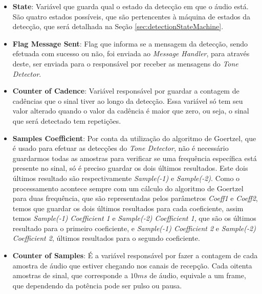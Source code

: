 \documentclass[monografia]{subfiles}
\begin{document}
		\begin{itemize}
		\item \textbf{State}: 
			Variável que guarda qual o estado da detecção em que o áudio está. São quatro estados possíveis, que são pertencentes 
			à máquina de estados da detecção, que será detalhada na Seção \ref{sec:detectionStateMachine}.
		\end{itemize}

		\begin{itemize}
		\item \textbf{Flag Message Sent}: 
			Flag que informa se a mensagem da detecção, sendo efetuada com sucesso ou não, foi enviada ao \textit{Message Handler},
			para através deste, ser enviada para o responsável por receber as mensagens do \textit{Tone Detector}.
		\end{itemize}

		\begin{itemize}
		\item \textbf{Counter of Cadence}: 
			Variável responsável por guardar a contagem de cadências que o sinal tiver ao longo da detecção. Essa variável só tem
			seu valor alterado quando o valor da cadência é maior que zero, ou seja, o sinal que será detectado tem repetições.
		\end{itemize}

		\begin{itemize}
		\item \textbf{Samples Coefficient}: 
			Por conta da utilização do algoritmo de Goertzel, que é usado para efetuar as detecções do 
			\textit{Tone Detector}, não é necessário guardarmos todas as amostras para verificar se uma frequência específica está presente no sinal, só é
			preciso guardar os dois últimos resultados. Este dois últimos resultado são respectivamente \textit{Sample(-1)} e \textit{Sample(-2)}. 
			Como o processamento acontece sempre com um cálculo do algoritmo de Goertzel para duas frequência, que são representadas pelos parâmetros 
			\textit{Coeff1} e \textit{Coeff2}, temos que guardar os dois últimos resultados para cada coeficiente, assim temos
			\textit{Sample(-1) Coefficient 1} e \textit{Sample(-2) Coefficient 1}, que são os últimos resultado para o primeiro coeficiente, e
			\textit{Sample(-1) Coefficient 2} e \textit{Sample(-2) Coefficient 2}, últimos resultados para o segundo coeficiente.
		\end{itemize}

		\begin{itemize}
		\item \textbf{Counter of Samples}:
			É a variável responsável por fazer a contagem de cada amostra de áudio que estiver chegando nos canais de recepção. Cada oitenta amostras 
			de sinal, que corresponde a $10 ms$ de áudio, equivale a um frame, que dependendo da potência pode ser pulso ou pausa. 
		\end{itemize}
\end{document}
